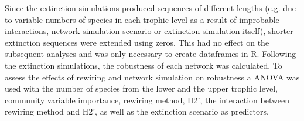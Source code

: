 \documentclass[12pt,a4paper]{article}
\begin{document}

Since the extinction simulations produced sequences of different lengths (e.g. due to variable numbers of species in each trophic level as a result of improbable interactions, network simulation scenario or extinction simulation itself), shorter extinction sequences were extended using zeros. This had no effect on the subsequent analyses and was only necessary to create dataframes in R.
Following the extinction simulations, the robustness of each network was calculated. To assess the effects of rewiring and network simulation on robustness a ANOVA was used with the number of species from the lower and the upper trophic level, community variable importance, rewiring method, H2', the interaction between rewiring method and H2', as well as the extinction scenario as predictors.

 
\end{document}
